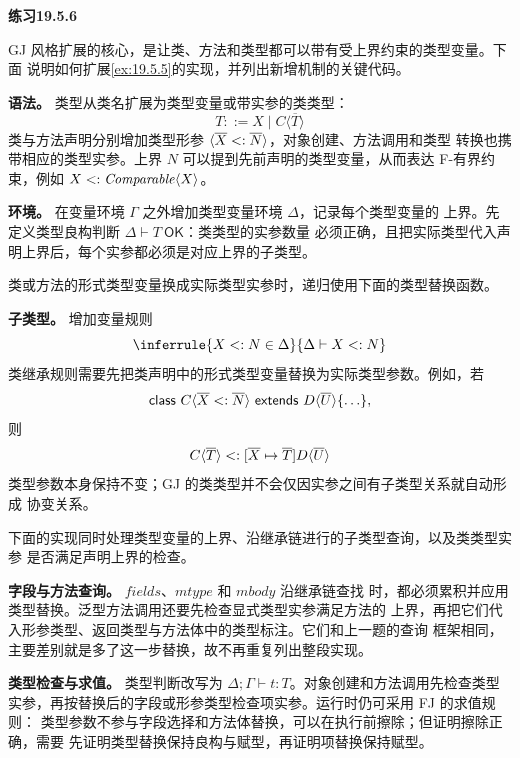\begin{taplsolutionentrybox}
\label{sol:translator:19.5.6}
\textbf{练习19.5.6}

GJ 风格扩展的核心，是让类、方法和类型都可以带有受上界约束的类型变量。下面
说明如何扩展\cref{ex:19.5.5}的实现，并列出新增机制的关键代码。

\textbf{语法。}
类型从类名扩展为类型变量或带实参的类类型：
\[
 T::=X\mid C\langle\overline T\rangle
\]
类与方法声明分别增加类型形参
\(\langle\overline X\mathrel{<:}\overline N\rangle\)，对象创建、方法调用和类型
转换也携带相应的类型实参。上界 \(N\) 可以提到先前声明的类型变量，从而表达
F-有界约束，例如 \(X\mathrel{<:}\mathit{Comparable}\langle X\rangle\)。


\textbf{环境。}
在变量环境 \(\Gamma\) 之外增加类型变量环境 \(\Delta\)，记录每个类型变量的
上界。先定义类型良构判断 \(\Delta\vdash T\ \mathsf{OK}\)：类类型的实参数量
必须正确，且把实际类型代入声明上界后，每个实参都必须是对应上界的子类型。

类或方法的形式类型变量换成实际类型实参时，递归使用下面的类型替换函数。


\textbf{子类型。}
增加变量规则
\[
 \inferrule{X\subtype N\in\Delta}{\Delta\vdash X\subtype N}
\]
类继承规则需要先把类声明中的形式类型变量替换为实际类型参数。例如，若
\[
 \mathsf{class}\ C\langle\overline X\mathrel{<:}\overline N\rangle
 \ \mathsf{extends}\ D\langle\overline U\rangle\{\ldots\},
\]
则
\[
 C\langle\overline T\rangle
 \mathrel{<:}
 [\overline X\mapsto\overline T]
 D\langle\overline U\rangle
\]
类型参数本身保持不变；GJ 的类类型并不会仅因实参之间有子类型关系就自动形成
协变关系。

下面的实现同时处理类型变量的上界、沿继承链进行的子类型查询，以及类类型实参
是否满足声明上界的检查。


\textbf{字段与方法查询。}
\(\mathit{fields}\)、\(\mathit{mtype}\) 和 \(\mathit{mbody}\) 沿继承链查找
时，都必须累积并应用类型替换。泛型方法调用还要先检查显式类型实参满足方法的
上界，再把它们代入形参类型、返回类型与方法体中的类型标注。它们和上一题的查询
框架相同，主要差别就是多了这一步替换，故不再重复列出整段实现。

\textbf{类型检查与求值。}
类型判断改写为 \(\Delta;\Gamma\vdash t:T\)。对象创建和方法调用先检查类型
实参，再按替换后的字段或形参类型检查项实参。运行时仍可采用 FJ 的求值规则：
类型参数不参与字段选择和方法体替换，可以在执行前擦除；但证明擦除正确，需要
先证明类型替换保持良构与赋型，再证明项替换保持赋型。


\end{taplsolutionentrybox}
